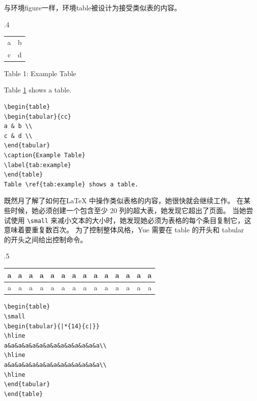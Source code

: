 与环境figure一样，环境table被设计为接受类似表的内容。
\begin{miniexammar}{.4\textandmarginlen}{
\begin{tabular}{cc}
a & b \\
c & d \\
\end{tabular}
\begin{center}
\hypertarget{fakedcaptiontab}{Table 1: Example Table}
\end{center}
Table \hyperlink{fakedcaptiontab}{1} shows a table.
}
\begin{lstlisting}
\begin{table}
\begin{tabular}{cc}
a & b \\
c & d \\
\end{tabular}
\caption{Example Table}
\label{tab:example}
\end{table}
Table \ref{tab:example} shows a table.
\end{lstlisting}
\end{miniexammar}

既然月了解了如何在\LaTeX{} 中操作类似表格的内容，她很快就会继续工作。 在某些时候，她必须创建一个包含至少 20 列的超大表，她发现它超出了页面。 当她尝试使用 \verb=\small= 来减小文本的大小时，她发现她必须为表格的每个条目复制它，这意味着要重复数百次。 为了控制整体风格，Yue 需要在 table 的开头和 tabular 的开头之间给出控制命令。

\begin{miniexammar}{.5\textandmarginlen}{
{
\tiny
\begin{tabular}{|*{14}{c|}}
\hline 
a&a&a&a&a&a&a&a&a&a&a&a&a&a\\
\hline
a&a&a&a&a&a&a&a&a&a&a&a&a&a\\
\hline
\end{tabular}
}
}
\begin{lstlisting}
\begin{table}
\small
\begin{tabular}{|*{14}{c|}}
\hline 
a&a&a&a&a&a&a&a&a&a&a&a&a&a\\
\hline
a&a&a&a&a&a&a&a&a&a&a&a&a&a\\
\hline
\end{tabular}
\end{table}
\end{lstlisting}
\end{miniexammar}

